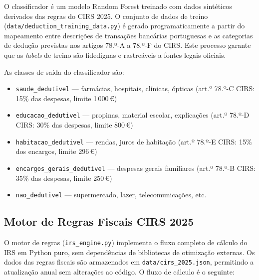 O classificador é um modelo Random Forest treinado com dados sintéticos derivados das regras do \ac{CIRS} 2025. O conjunto de dados de treino (\texttt{data/deduction\_training\_data.py}) é gerado programaticamente a partir do mapeamento entre descrições de transações bancárias portuguesas e as categorias de dedução previstas nos artigos 78.º-A a 78.º-F do \ac{CIRS}. Este processo garante que as \textit{labels} de treino são fidedignas e rastreáveis a fontes legais oficiais.

As classes de saída do classificador são:
\begin{itemize}
    \item \texttt{saude\_dedutivel} --- farmácias, hospitais, clínicas, ópticas (art.º 78.º-C \ac{CIRS}: 15\% das despesas, limite 1\,000\,€)
    \item \texttt{educacao\_dedutivel} --- propinas, material escolar, explicações (art.º 78.º-D \ac{CIRS}: 30\% das despesas, limite 800\,€)
    \item \texttt{habitacao\_dedutivel} --- rendas, juros de habitação (art.º 78.º-E \ac{CIRS}: 15\% dos encargos, limite 296\,€)
    \item \texttt{encargos\_gerais\_dedutivel} --- despesas gerais familiares (art.º 78.º-B \ac{CIRS}: 35\% das despesas, limite 250\,€)
    \item \texttt{nao\_dedutivel} --- supermercado, lazer, telecomunicações, etc.
\end{itemize}

\subsection{Motor de Regras Fiscais CIRS 2025}
\label{sec:impl-irs-engine}

O motor de regras (\texttt{irs\_engine.py}) implementa o fluxo completo de cálculo do \ac{IRS} em Python puro, sem dependências de bibliotecas de otimização externas. Os dados das regras fiscais são armazenados em \texttt{data/cirs\_2025.json}, permitindo a atualização anual sem alterações ao código. O fluxo de cálculo é o seguinte:

